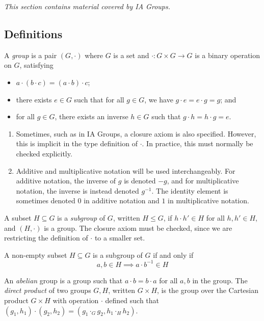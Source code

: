 \textit{This section contains material covered by IA Groups.}

\subsection{Definitions}
A \textit{group} is a pair \( (G, \cdot) \) where \( G \) is a set and \( \cdot \colon G \times G \to G \) is a binary operation on \( G \), satisfying
\begin{itemize}
	\item \( a \cdot (b \cdot c) = (a \cdot b) \cdot c \);
	\item there exists \( e \in G \) such that for all \( g \in G \), we have \( g \cdot e = e \cdot g = g \); and
	\item for all \( g \in G \), there exists an inverse \( h \in G \) such that \( g \cdot h = h \cdot g = e \).
\end{itemize}
\begin{remark}
	\begin{enumerate}
		\item Sometimes, such as in IA Groups, a closure axiom is also specified.
		      However, this is implicit in the type definition of \( \cdot \).
		      In practice, this must normally be checked explicitly.
		\item Additive and multiplicative notation will be used interchangeably.
		      For additive notation, the inverse of \( g \) is denoted \( -g \), and for multiplicative notation, the inverse is instead denoted \( g^{-1} \).
		      The identity element is sometimes denoted \( 0 \) in additive notation and \( 1 \) in multiplicative notation.
	\end{enumerate}
\end{remark}
A subset \( H \subseteq G \) is a \textit{subgroup} of \( G \), written \( H \leq G \), if \( h \cdot h' \in H \) for all \( h, h' \in H \), and \( (H, \cdot) \) is a group.
The closure axiom must be checked, since we are restricting the definition of \( \cdot \) to a smaller set.
\begin{remark}
	A non-empty subset \( H \subseteq G \) is a subgroup of \( G \) if and only if
	\[
		a, b \in H \implies a \cdot b^{-1} \in H
	\]
\end{remark}
An \textit{abelian} group is a group such that \( a \cdot b = b \cdot a \) for all \( a, b \) in the group.
The \textit{direct product} of two groups \( G, H \), written \( G \times H \), is the group over the Cartesian product \( G \times H \) with operation \( \cdot \) defined such that \( (g_1, h_1) \cdot (g_2, h_2) = (g_1 \cdot_G g_2, h_1 \cdot_H h_2) \).

